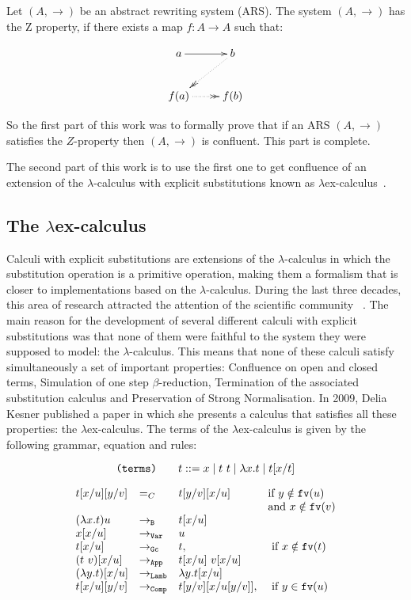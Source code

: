\documentclass{llncs}
\newcommand{\fv}[1]{{\tt fv}(#1)}
\begin{document}
\begin{definition}
      Let $(A,\to)$ be an abstract rewriting system (ARS). The system
    $(A,\to)$ has the Z property, if there exists a map $f:A \to A$
    such that:
    
    \[
      \xymatrix{
        a \ar[r] &  b \ar@{.>>}[dl]\\
        f(a) \ar@{.>>}[r] & f(b) \\ 
      }
    \]
\end{definition}

So the first part of this work was to formally prove that if an ARS $(A,\to)$ satisfies the $Z$-property then $(A,\to)$ is confluent. This part is complete. 

The second part of this work is to use the first one to get confluence of an extension of the $\lambda$-calculus with explicit substitutions known as $\lambda$ex-calculus~\cite{kes09}.

\subsection{The $\lambda$ex-calculus }

Calculi with explicit substitutions are extensions of the
$\lambda$-calculus in which the substitution operation is a primitive
operation, making them a formalism that is closer to implementations
based on the $\lambda$-calculus. During the last three decades, this
area of research attracted the attention of the scientific community
~\cite{Lins86,accl91,Bloo95,BeBrLeRD96,jfp,Munoz96,NaWi98,kes09}. The
main reason for the development of several different calculi with
explicit substitutions was that none of them were faithful to the
system they were supposed to model: the $\lambda$-calculus. This means
that none of these calculi satisfy simultaneously a set of important
properties: Confluence on open and closed terms, Simulation of one
step $\beta$-reduction, Termination of the associated substitution
calculus and Preservation of Strong Normalisation. In 2009, Delia
Kesner published a paper in which she presents a calculus that
satisfies all these properties: the $\lambda$ex-calculus. The terms of
the $\lambda$ex-calculus is given by the following grammar, equation and rules:

$$\mbox{\tt (terms)}\;\;\;\;\;\;\; t ::= x \mid t\ t \mid \lambda x.t \mid t[x/t]$$

$$\begin{array}{llll}
    t[x/u][y/v] & =_C & t[y/v][x/u] & \mbox{if } y\notin \fv{u} \\
                &&& \mbox{and } x\notin \fv{v} \\
    (\lambda x.t) u & \to_{\tt B} & t[x/u] & \\
    x[x/u] & \to_{\tt Var} & u & \\      
    t[x/u] & \to_{\tt Gc} & t, & \mbox{ if } x \notin\fv{t} \\      
    (t\ v)[x/u] & \to_{\tt App} & t[x/u]\ v[x/u] & \\
    (\lambda y. t)[x/u] & \to_{\tt Lamb} & \lambda y.t[x/u] & \\
    t[x/u][y/v] & \to_{\tt Comp} & t[y/v][x/u[y/v]], & \mbox{ if } y \in\fv{u}            
  \end{array}$$
  
\end{document}
